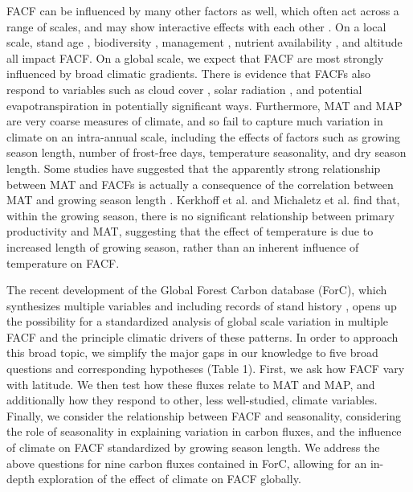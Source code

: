 \documentclass[]{article}
\begin{document}
FACF can be influenced by many other factors as well, which often act
across a range of scales, and may show interactive effects with each
other \citep{cleveland_relationships_2011}. On a local scale, stand age
\citep{litton_carbon_2007, gillman_latitude_2015}, biodiversity
\citep{liang_positive_2016}, management \citep{simova_enigma_2017},
nutrient availability \citep{aragao_above_2009}, and altitude
\citep{girardin_net_2010, malhi_variation_2017} all impact FACF. On a
global scale, we expect that FACF are most strongly influenced by broad
climatic gradients. There is evidence that FACFs also respond to
variables such as cloud cover \citep{taylor_temperature_2017}, solar
radiation \citep{fyllas_solar_2017}, and potential evapotranspiration
\citep{kerkhoff_plant_2005} in potentially significant ways.
Furthermore, MAT and MAP are very coarse measures of climate, and so
fail to capture much variation in climate on an intra-annual scale,
including the effects of factors such as growing season length, number
of frost-free days, temperature seasonality, and dry season length. Some
studies have suggested that the apparently strong relationship between
MAT and FACFs is actually a consequence of the correlation between MAT
and growing season length
\citep{kerkhoff_plant_2005, malhi_productivity_2012, michaletz_convergence_2014, michaletz_drivers_2018}.
Kerkhoff et al. \citeyearpar{kerkhoff_plant_2005} and Michaletz et al.
\citeyearpar{michaletz_convergence_2014} find that, within the growing
season, there is no significant relationship between primary
productivity and MAT, suggesting that the effect of temperature is due
to increased length of growing season, rather than an inherent influence
of temperature on FACF.

The recent development of the Global Forest Carbon database (ForC),
which synthesizes multiple variables and including records of stand
history
\citep{anderson-teixeira_carbon_2016, anderson-teixeira_forc_2018},
opens up the possibility for a standardized analysis of global scale
variation in multiple FACF and the principle climatic drivers of these
patterns. In order to approach this broad topic, we simplify the major
gaps in our knowledge to five broad questions and corresponding
hypotheses (Table 1). First, we ask how FACF vary with latitude. We then
test how these fluxes relate to MAT and MAP, and additionally how they
respond to other, less well-studied, climate variables. Finally, we
consider the relationship between FACF and seasonality, considering the
role of seasonality in explaining variation in carbon fluxes, and the
influence of climate on FACF standardized by growing season length. We
address the above questions for nine carbon fluxes contained in ForC,
allowing for an in-depth exploration of the effect of climate on FACF
globally.
\end{document}
